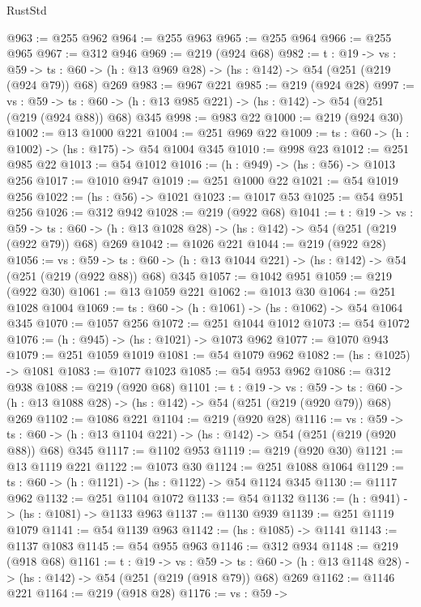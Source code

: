 \begin{lexlean}{RustStd}
\begin{coremodule}
{\begin{coremodule}
{{{{@963 := @255 @962
@964 := @255 @963
@965 := @255 @964
@966 := @255 @965
@967 := @312 @946
@969 := @219 (@924 @68)
@982 := {t : @19} ->
  {vs : @59} ->
  {ts : @60} -> (h : @13 @969 @28) -> (hs : @142) -> @54 (@251 (@219 (@924 @79)) @68) @269
@983 := @967 @221
@985 := @219 (@924 @28)
@997 := {vs : @59} ->
  {ts : @60} -> (h : @13 @985 @221) -> (hs : @142) -> @54 (@251 (@219 (@924 @88)) @68) @345
@998 := @983 @22
@1000 := @219 (@924 @30)
@1002 := @13 @1000 @221
@1004 := @251 @969 @22
@1009 := {ts : @60} -> (h : @1002) -> (hs : @175) -> @54 @1004 @345
@1010 := @998 @23
@1012 := @251 @985 @22
@1013 := @54 @1012
@1016 := (h : @949) -> (hs : @56) -> @1013 @256
@1017 := @1010 @947
@1019 := @251 @1000 @22
@1021 := @54 @1019 @256
@1022 := (hs : @56) -> @1021
@1023 := @1017 @53
@1025 := @54 @951 @256
@1026 := @312 @942
@1028 := @219 (@922 @68)
@1041 := {t : @19} ->
  {vs : @59} ->
  {ts : @60} -> (h : @13 @1028 @28) -> (hs : @142) -> @54 (@251 (@219 (@922 @79)) @68) @269
@1042 := @1026 @221
@1044 := @219 (@922 @28)
@1056 := {vs : @59} ->
  {ts : @60} -> (h : @13 @1044 @221) -> (hs : @142) -> @54 (@251 (@219 (@922 @88)) @68) @345
@1057 := @1042 @951
@1059 := @219 (@922 @30)
@1061 := @13 @1059 @221
@1062 := @1013 @30
@1064 := @251 @1028 @1004
@1069 := {ts : @60} -> (h : @1061) -> (hs : @1062) -> @54 @1064 @345
@1070 := @1057 @256
@1072 := @251 @1044 @1012
@1073 := @54 @1072
@1076 := (h : @945) -> (hs : @1021) -> @1073 @962
@1077 := @1070 @943
@1079 := @251 @1059 @1019
@1081 := @54 @1079 @962
@1082 := (hs : @1025) -> @1081
@1083 := @1077 @1023
@1085 := @54 @953 @962
@1086 := @312 @938
@1088 := @219 (@920 @68)
@1101 := {t : @19} ->
  {vs : @59} ->
  {ts : @60} -> (h : @13 @1088 @28) -> (hs : @142) -> @54 (@251 (@219 (@920 @79)) @68) @269
@1102 := @1086 @221
@1104 := @219 (@920 @28)
@1116 := {vs : @59} ->
  {ts : @60} -> (h : @13 @1104 @221) -> (hs : @142) -> @54 (@251 (@219 (@920 @88)) @68) @345
@1117 := @1102 @953
@1119 := @219 (@920 @30)
@1121 := @13 @1119 @221
@1122 := @1073 @30
@1124 := @251 @1088 @1064
@1129 := {ts : @60} -> (h : @1121) -> (hs : @1122) -> @54 @1124 @345
@1130 := @1117 @962
@1132 := @251 @1104 @1072
@1133 := @54 @1132
@1136 := (h : @941) -> (hs : @1081) -> @1133 @963
@1137 := @1130 @939
@1139 := @251 @1119 @1079
@1141 := @54 @1139 @963
@1142 := (hs : @1085) -> @1141
@1143 := @1137 @1083
@1145 := @54 @955 @963
@1146 := @312 @934
@1148 := @219 (@918 @68)
@1161 := {t : @19} ->
  {vs : @59} ->
  {ts : @60} -> (h : @13 @1148 @28) -> (hs : @142) -> @54 (@251 (@219 (@918 @79)) @68) @269
@1162 := @1146 @221
@1164 := @219 (@918 @28)
@1176 := {vs : @59} ->
}}}}
\end{coremodule}}
\end{coremodule}
\end{lexlean}
